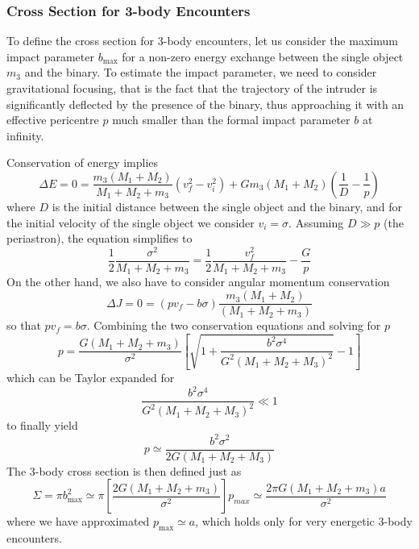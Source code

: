 \subsubsection*{Cross Section for 3-body Encounters}
To deﬁne the cross section for 3-body encounters, let us consider the maximum impact parameter $b_{\text{max}}$ for a non-zero energy exchange between the single object $m_{3}$ and the binary. To estimate the impact parameter, we need to consider gravitational focusing, that is the fact that the trajectory of the intruder is signiﬁcantly deﬂected by the presence of the binary, thus approaching it with an eﬀective pericentre $p$ much smaller than the formal impact parameter $b$ at inﬁnity.
\par Conservation of energy implies 
\begin{equation*}
    \Delta E = 0 = \frac{m_{3}(M_{1}+M_{2})}{M_{1}+M_{2}+m_{3}}(v^{2}_{f}-v^{2}_{i})+Gm_{3}(M_{1}+M_{2})\left(\frac{1}{D}-\frac{1}{p}\right)
\end{equation*}
where $D$ is the initial distance between the single object and the binary, and for the initial velocity of the single object we consider $v_{i} = \sigma$. Assuming $D\gg p$ (the periastron), the equation simplifies to 
\begin{equation*}
    \frac{1}{2}\frac{\sigma^{2}}{M_{1}+M_{2}+m_{3}} = \frac{1}{2}\frac{v^{2}_{f}}{M_{1}+M_{2}+m_{3}}-\frac{G}{p}
\end{equation*}
On the other hand, we also have to consider angular momentum conservation
\begin{equation*}
    \Delta J = 0 = (pv_{f}-b\sigma)\frac{m_{3}(M_{1}+ M_{2})}{(M_{1}+M_{2}+m_{3})}
\end{equation*}
so that $pv_{f}=b\sigma$. Combining the two conservation equations and solving for $p$
\begin{equation*}
    p = \frac{G(M_{1}+M_{2}+m_{3})}{\sigma^{2}}\left[\sqrt{1+\frac{b^{2}\sigma^{4}}{G^{2}(M_{1}+M_{2}+M_{3})^{2}}}-1\right]
\end{equation*}
which can be Taylor expanded for 
\begin{equation*}
    \frac{b^{2}\sigma^{4}}{G^{2}(M_{1}+M_{2}+M_{3})^{2}} \ll 1
\end{equation*}
to finally yield 
\begin{equation}
    p \simeq \frac{b^{2}\sigma^{2}}{2G(M_{1}+M_{2}+M_{3})}
    \label{eq:periastron}
\end{equation}
The 3-body cross section is then defined just as 
\begin{equation*}
    \Sigma = \pi b^{2}_{\text{max}} \simeq \pi \left[\frac{2G(M_{1}+M_{2}+m_{3})}{\sigma^{2}}\right]p_{max} \simeq \frac{2\pi G(M_{1}+M_{2}+m_{3})a}{\sigma^{2}}
\end{equation*}
where we have approximated $p_{\text{max}}\simeq a$, which holds only for very energetic 3-body encounters.
